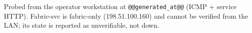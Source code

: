 Probed from the operator workstation at \texttt{@@generated_at@@} (ICMP + service HTTP).
Fabric-svc is fabric-only (198.51.100.160) and cannot be verified from the
LAN; its state is reported as unverifiable, not down.
